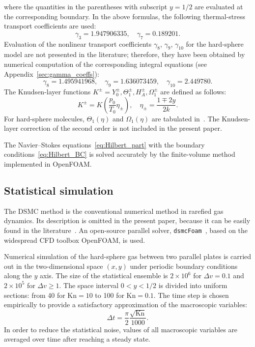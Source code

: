 \documentclass[review]{elsarticle}
\newcommand{\Kn}{\mathrm{Kn}}
\begin{document}
where the quantities in the parentheses with subscript \(y=1/2\) are evaluated at the corresponding boundary.
In the above formulas, the following thermal-stress transport coefficients are used:
\begin{equation}\label{eq:gamma_tabular}
    \gamma_3 = 1.947906335, \quad \gamma_7 = 0.189201.
\end{equation}
Evaluation of the nonlinear transport coefficients \(\gamma_8\), \(\gamma_9\), \(\gamma_{10}\)
for the hard-sphere model are not presented in the literature;
therefore, they have been obtained by numerical computation of the corresponding integral equations
(see Appendix~\ref{sec:gamma_coeffs}):
\begin{equation}\label{eq:gamma_numerical}
    \gamma_8 = 1.495941968, \quad \gamma_9 = 1.636073459, \quad \gamma_{10} = 2.449780.
\end{equation}
The Knudsen-layer functions \(K^\pm = Y_0^\pm, \Theta_1^\pm, H_A^\pm, \Omega_1^\pm\)
are defined as follows:
\begin{equation}\label{eq:nonlinear_knudsen_functions}
     K^\pm = K\left(\frac{p_0}{T_0}\eta_\pm\right), \quad \eta_\pm = \frac{1 \mp 2y}{2k}.
\end{equation}
For hard-sphere molecules, \(\Theta_1(\eta)\) and \(\Omega_1(\eta)\)
are tabulated in~\citet{Ohwada1989jump, Sone2002, Sone2007, Takata2015}.
The Knudsen-layer correction of the second order is not included in the present paper.

The Navier--Stokes equations~\eqref{eq:Hilbert_part}
with the boundary conditions~\eqref{eq:Hilbert_BC}
is solved accurately by the finite-volume method
implemented in OpenFOAM\textregistered{}.

\subsection{Statistical simulation}

The DSMC method is the conventional numerical method in rarefied gas dynamics.
Its description is omitted in the present paper,
because it can be easily found in the literature~\citep[see e.g.][]{Bird1994, Sone2007}.
An open-source parallel solver, \verb+dsmcFoam+~\citep{Reese2010},
based on the widespread CFD toolbox OpenFOAM\textregistered{}, is used.

Numerical simulation of the hard-sphere gas between two parallel plates is carried out
in the two-dimensional space \((x,y)\) under periodic boundary conditions along the \(y\) axis.
The size of the statistical ensemble is \(2\times10^6\) for \(\Delta{v}=0.1\)
and \(2\times10^5\) for \(\Delta{v}\ge1\).
The space interval \(0<y<1/2\) is divided into uniform sections:
from 40 for \(\Kn=10\) to 100 for \(\Kn=0.1\).
The time step is chosen empirically to provide a satisfactory approximation of the macroscopic variables:
\begin{equation}\label{eq:dsmc_timestep}
    \Delta{t} = \frac{\pi}2 \frac{\sqrt{\Kn}}{1000}.
\end{equation}
In order to reduce the statistical noise, values of all macroscopic variables
are averaged over time after reaching a steady state.
\end{document}
